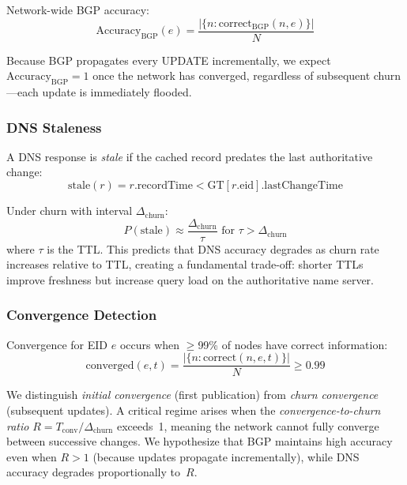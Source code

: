 \documentclass[journal,twocolumn]{IEEEtran}
\begin{document}
Network-wide BGP accuracy:
\begin{equation}
\text{Accuracy}_{\text{BGP}}(e) = \frac{|\{n : \text{correct}_{\text{BGP}}(n, e)\}|}{N}
\end{equation}

Because BGP propagates every UPDATE incrementally, we expect $\text{Accuracy}_{\text{BGP}} = 1$ once the network has converged, regardless of subsequent churn---each update is immediately flooded.

\subsubsection{DNS Staleness}

A DNS response is \emph{stale} if the cached record predates the last authoritative change:
\begin{equation}
\text{stale}(r) = r.\text{recordTime} < \text{GT}[r.\text{eid}].\text{lastChangeTime}
\end{equation}

Under churn with interval $\Delta_{\text{churn}}$:
\begin{equation}
P(\text{stale}) \approx \frac{\Delta_{\text{churn}}}{\tau} \text{ for } \tau > \Delta_{\text{churn}}
\end{equation}
where $\tau$ is the TTL. This predicts that DNS accuracy degrades as churn rate increases relative to TTL, creating a fundamental trade-off: shorter TTLs improve freshness but increase query load on the authoritative name server.

\subsubsection{Convergence Detection}

Convergence for EID $e$ occurs when $\geq$99\% of nodes have correct information:
\begin{equation}
\text{converged}(e, t) = \frac{|\{n : \text{correct}(n, e, t)\}|}{N} \geq 0.99
\end{equation}

We distinguish \emph{initial convergence} (first publication) from \emph{churn convergence} (subsequent updates). A critical regime arises when the \emph{convergence-to-churn ratio} $R = T_{\text{conv}} / \Delta_{\text{churn}}$ exceeds~1, meaning the network cannot fully converge between successive changes. We hypothesize that BGP maintains high accuracy even when $R > 1$ (because updates propagate incrementally), while DNS accuracy degrades proportionally to~$R$.
\end{document}

